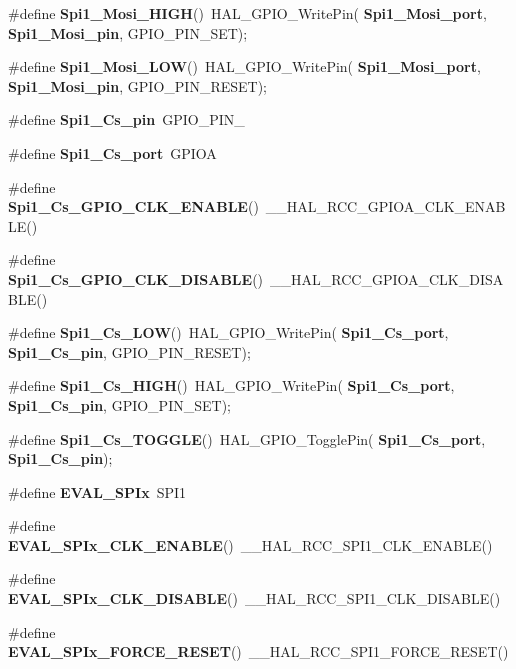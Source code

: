 \begin{DoxyCompactItemize}
\item 
\#define \textbf{ Spi1\+\_\+\+Mosi\+\_\+\+H\+I\+GH}()~H\+A\+L\+\_\+\+G\+P\+I\+O\+\_\+\+Write\+Pin(\textbf{ Spi1\+\_\+\+Mosi\+\_\+port},\textbf{ Spi1\+\_\+\+Mosi\+\_\+pin}, G\+P\+I\+O\+\_\+\+P\+I\+N\+\_\+\+S\+ET);
\item 
\#define \textbf{ Spi1\+\_\+\+Mosi\+\_\+\+L\+OW}()~H\+A\+L\+\_\+\+G\+P\+I\+O\+\_\+\+Write\+Pin(\textbf{ Spi1\+\_\+\+Mosi\+\_\+port},\textbf{ Spi1\+\_\+\+Mosi\+\_\+pin}, G\+P\+I\+O\+\_\+\+P\+I\+N\+\_\+\+R\+E\+S\+ET);
\item 
\#define \textbf{ Spi1\+\_\+\+Cs\+\_\+pin}~G\+P\+I\+O\+\_\+\+P\+I\+N\+\_
\item 
\#define \textbf{ Spi1\+\_\+\+Cs\+\_\+port}~G\+P\+I\+OA
\item 
\#define \textbf{ Spi1\+\_\+\+Cs\+\_\+\+G\+P\+I\+O\+\_\+\+C\+L\+K\+\_\+\+E\+N\+A\+B\+LE}()~\+\_\+\+\_\+\+H\+A\+L\+\_\+\+R\+C\+C\+\_\+\+G\+P\+I\+O\+A\+\_\+\+C\+L\+K\+\_\+\+E\+N\+A\+B\+LE()
\item 
\#define \textbf{ Spi1\+\_\+\+Cs\+\_\+\+G\+P\+I\+O\+\_\+\+C\+L\+K\+\_\+\+D\+I\+S\+A\+B\+LE}()~\+\_\+\+\_\+\+H\+A\+L\+\_\+\+R\+C\+C\+\_\+\+G\+P\+I\+O\+A\+\_\+\+C\+L\+K\+\_\+\+D\+I\+S\+A\+B\+LE()
\item 
\#define \textbf{ Spi1\+\_\+\+Cs\+\_\+\+L\+OW}()~H\+A\+L\+\_\+\+G\+P\+I\+O\+\_\+\+Write\+Pin(\textbf{ Spi1\+\_\+\+Cs\+\_\+port},\textbf{ Spi1\+\_\+\+Cs\+\_\+pin}, G\+P\+I\+O\+\_\+\+P\+I\+N\+\_\+\+R\+E\+S\+ET);
\item 
\#define \textbf{ Spi1\+\_\+\+Cs\+\_\+\+H\+I\+GH}()~H\+A\+L\+\_\+\+G\+P\+I\+O\+\_\+\+Write\+Pin(\textbf{ Spi1\+\_\+\+Cs\+\_\+port},\textbf{ Spi1\+\_\+\+Cs\+\_\+pin}, G\+P\+I\+O\+\_\+\+P\+I\+N\+\_\+\+S\+ET);
\item 
\#define \textbf{ Spi1\+\_\+\+Cs\+\_\+\+T\+O\+G\+G\+LE}()~H\+A\+L\+\_\+\+G\+P\+I\+O\+\_\+\+Toggle\+Pin(\textbf{ Spi1\+\_\+\+Cs\+\_\+port},\textbf{ Spi1\+\_\+\+Cs\+\_\+pin});
\item 
\#define \textbf{ E\+V\+A\+L\+\_\+\+S\+P\+Ix}~S\+P\+I1
\item 
\#define \textbf{ E\+V\+A\+L\+\_\+\+S\+P\+Ix\+\_\+\+C\+L\+K\+\_\+\+E\+N\+A\+B\+LE}()~\+\_\+\+\_\+\+H\+A\+L\+\_\+\+R\+C\+C\+\_\+\+S\+P\+I1\+\_\+\+C\+L\+K\+\_\+\+E\+N\+A\+B\+LE()
\item 
\#define \textbf{ E\+V\+A\+L\+\_\+\+S\+P\+Ix\+\_\+\+C\+L\+K\+\_\+\+D\+I\+S\+A\+B\+LE}()~\+\_\+\+\_\+\+H\+A\+L\+\_\+\+R\+C\+C\+\_\+\+S\+P\+I1\+\_\+\+C\+L\+K\+\_\+\+D\+I\+S\+A\+B\+LE()
\item 
\#define \textbf{ E\+V\+A\+L\+\_\+\+S\+P\+Ix\+\_\+\+F\+O\+R\+C\+E\+\_\+\+R\+E\+S\+ET}()~\+\_\+\+\_\+\+H\+A\+L\+\_\+\+R\+C\+C\+\_\+\+S\+P\+I1\+\_\+\+F\+O\+R\+C\+E\+\_\+\+R\+E\+S\+ET()

\end{DoxyCompactItemize}

